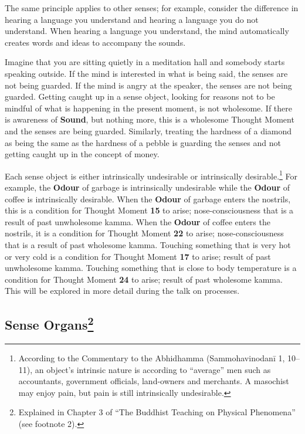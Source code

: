 The same principle applies to other senses; for example, consider the difference in hearing a language you understand and hearing a language you do not understand. When hearing a language you understand, the mind automatically creates words and ideas to accompany the sounds.

Imagine that you are sitting quietly in a meditation hall and somebody starts speaking outside. If the mind is interested in what is being said, the senses are not being guarded. If the mind is angry at the speaker, the senses are not being guarded. Getting caught up in a sense object, looking for reasons not to be mindful of what is happening in the present moment, is not wholesome. If there is awareness of \textbf{Sound}, but nothing more, this is a wholesome Thought Moment and the senses are being guarded. Similarly, treating the hardness of a diamond as being the same as the hardness of a pebble is guarding the senses and not getting caught up in the concept of money.

Each sense object is either intrinsically undesirable or intrinsically desirable.\footnote{According to the Commentary to the Abhidhamma (Sammohavinodanī 1, 10--11), an object’s intrinsic nature is according to “average” men such as accountants, government officials, land-owners and merchants. A masochist may enjoy pain, but pain is still intrinsically undesirable.} For example, the \textbf{Odour} of garbage is intrinsically undesirable while the \textbf{Odour} of coffee is intrinsically desirable. When the \textbf{Odour} of garbage enters the nostrils, this is a condition for Thought Moment \textbf{15} to arise; nose-consciousness that is a result of past unwholesome kamma. When the \textbf{Odour} of coffee enters the nostrils, it is a condition for Thought Moment \textbf{22} to arise; nose-consciousness that is a result of past wholesome kamma. Touching something that is very hot or very cold is a condition for Thought Moment \textbf{17} to arise; result of past unwholesome kamma. Touching something that is close to body temperature is a condition for Thought Moment \textbf{24} to arise; result of past wholesome kamma. This will be explored in more detail during the talk on processes.

\subsection*{Sense Organs\footnote{Explained in Chapter 3 of “The Buddhist Teaching on Physical Phenomena” (see footnote 2).}}

